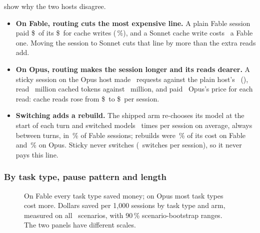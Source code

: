  show why the two hosts disagree.
\begin{itemize}
  \item \textbf{On Fable, routing cuts the most expensive line.} A plain Fable session paid \$\CompFableAnchorWrite\
    of its \$\CompFableAnchorTotal\ for cache writes (\WriteShareFableAnchor\,\%), and a Sonnet cache write costs
    \SonnetFableWritePriceX\X\ a Fable one. Moving the session to Sonnet cuts that line by more than the extra reads
    add.
  \item \textbf{On Opus, routing makes the session longer and its reads dearer.} A sticky session on the Opus
    host made \CompOpusStickyReq\ requests against the plain host's \CompOpusAnchorReq\
    (\ReqRatioOpusSticky\X), read \CompOpusStickyReadTok\ million cached tokens against
    \CompOpusAnchorReadTok\ million, and paid \SonnetOpusReadPriceX\X\ Opus's price for each read: cache
    reads rose from \$\CompOpusAnchorRead\ to \$\CompOpusStickyRead\ per session.
  \item \textbf{Switching adds a rebuild.} The shipped arm re-chooses its model at the start of each turn and
    switched models \SwitchFable\ times per session on average, always between turns, in \SwitchShareFable\,\% of Fable sessions; rebuilds were \RebuildFable\,\% of its cost on
    Fable and \RebuildOpus\,\% on Opus. Sticky never switches (\SwitchStickyFable\ switches per session),
    so it never pays this line.
\end{itemize}

\subsubsection{By task type, pause pattern and length}\label{vt:sec:slices}

\begin{figure}[tbp]
\centering
{}\par\smallskip

\par\medskip
{}
\caption{On Fable every task type saved money; on Opus most task types cost more. Dollars saved per 1,000 sessions by task type and arm, measured on all \NScenarios\ scenarios, with
90\,\% scenario-bootstrap ranges. The two panels have different scales.}
\label{vt:fig:savings}
\end{figure}

